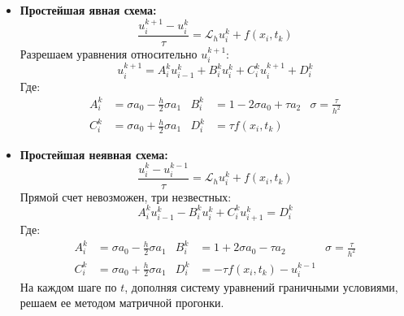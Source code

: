 \documentclass[a4paper,12pt]{report}
\begin{document}
\begin{itemize}
\item{{\bf Простейшая явная схема:}\\
\begin{equation}
\frac{u_i^{k+1} - u_i^k}{\tau} = \mathcal{L}_h u_i^k + f(x_i,t_k)
\end{equation}
Разрешаем уравнения относительно $u_i^{k+1}$:
\begin{equation}
u_i^{k+1}= A_i^ku_{i-1}^k + B_i^k u_i^k + C_i^k u_i^{k+1} + D_i^k
\end{equation}
Где:
\begin{equation}
\begin{aligned}
A_i^k & = \sigma a_{0} - \frac{h}{2}\sigma a_1 & B_i^k & = 1 - 2\sigma a_{0} + \tau a_2 & \sigma = \frac{\tau}{h^2} \\
C_i^k & = \sigma a_{0} + \frac{h}{2}\sigma a_1 & D_i^k & = \tau f(x_i,t_k)
\end{aligned}
\end{equation}
}
\item{{\bf Простейшая неявная схема:}
\begin{equation}
\frac{u_i^{k} - u_i^{k-1}}{\tau} = \mathcal{L}_h u_i^k + f(x_i,t_k)
\end{equation}
Прямой счет невозможен, три незвестных:
\begin{equation}
A_i^k u_{i-1}^k - B_i^k u_i^k + C_i^k u_{i+1}^{k} = D_i^k
\end{equation}
Где:
\begin{equation}
\begin{aligned}
A_i^k & = \sigma a_{0} - \frac{h}{2}\sigma a_1 & B_i^k & = 1 + 2\sigma a_{0} - \tau a_2 & \sigma = \frac{\tau}{h^2} \\
C_i^k & = \sigma a_{0} + \frac{h}{2}\sigma a_1 & D_i^k & = -\tau f(x_i,t_k) - u_i^{k-1}
\end{aligned}
\end{equation}
На каждом шаге по $t$, дополняя систему уравнений граничными условиями, решаем ее методом матричной прогонки.
}
\end{itemize}
\end{document}
